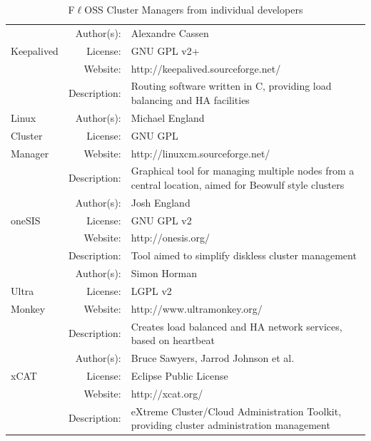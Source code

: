 \documentclass[a4paper, 12pt]{book}
\begin{document}
\begin{table}[H]
  \centering
  \begin{tabular}{ | m{2cm} | r  m{10cm} | }

    \hline    
		 & Author(s): &  Alexandre Cassen\\
      Keepalived & License: &  GNU GPL v2+\\
		 & Website: &  http://keepalived.sourceforge.net/\\
	 	 & Description: & Routing software written in C, providing load balancing and HA facilities\\
    \hline
	Linux	 & Author(s): & Michael England \\
	Cluster	 & License: & GNU GPL \\
	Manager	 & Website: & http://linuxcm.sourceforge.net/ \\
	 	 & Description: & Graphical tool for managing multiple nodes from a central location, aimed for Beowulf style clusters \\
    \hline    
		 & Author(s): & Josh England \\
      oneSIS	 & License: & GNU GPL v2 \\
		 & Website: & http://onesis.org/ \\
	 	 & Description: & Tool aimed to simplify diskless cluster management \\  
    \hline    
		 & Author(s): & Simon Horman \\
      Ultra	 & License: & LGPL v2 \\
	Monkey	 & Website: & http://www.ultramonkey.org/ \\
	 	 & Description: & Creates load balanced and HA network services, based on heartbeat \\
    \hline    
		 & Author(s): & Bruce Sawyers, Jarrod Johnson et al. \\
      xCAT	 & License: & Eclipse Public License \\
		 & Website: & http://xcat.org/ \\
	 	 & Description: & eXtreme Cluster/Cloud Administration Toolkit, providing cluster administration management \\
    \hline

  \end{tabular}
\caption{F$\ell$OSS Cluster Managers from individual developers}
\label{table:cluster_managers_individuals}
\end{table}
\end{document}
